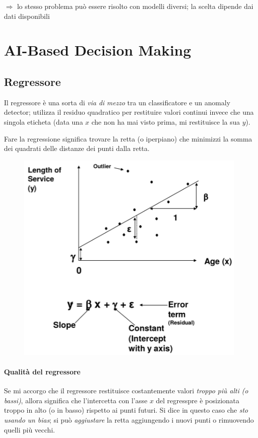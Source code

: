 \documentclass{report}
\begin{document}
\noindent $\Rightarrow$ lo stesso problema può essere risolto con modelli diversi; la scelta dipende dai dati disponibili







\chapter{AI-Based Decision Making}

\section{Regressore}

Il regressore è una sorta di \textit{via di mezzo} tra un classificatore e un anomaly detector; utilizza il residuo quadratico 
per restituire valori continui invece che una singola eticheta (data una $x$ che non ha mai visto prima, mi restituisce la sua $y$).

\noindent Fare la regressione significa trovare la retta (o iperpiano) che minimizzi la somma dei quadrati delle distanze dei punti dalla retta.

\begin{figure}[H]
    \centering
    \includegraphics[width=0.6\linewidth]{images/regressore.png}
\end{figure}

\subsubsection{Qualità del regressore}

Se mi accorgo che il regressore restituisce costantemente valori \textit{troppo più alti (o bassi)}, allora significa che l'intercetta con l'asse $x$
del regresspre è posizionata troppo in alto (o in basso) rispetto ai punti futuri. Si dice in questo caso che \textit{sto usando un bias}; si può 
\textit{aggiustare} la retta aggiungendo i nuovi punti o rimuovendo quelli più vecchi.
\end{document}
